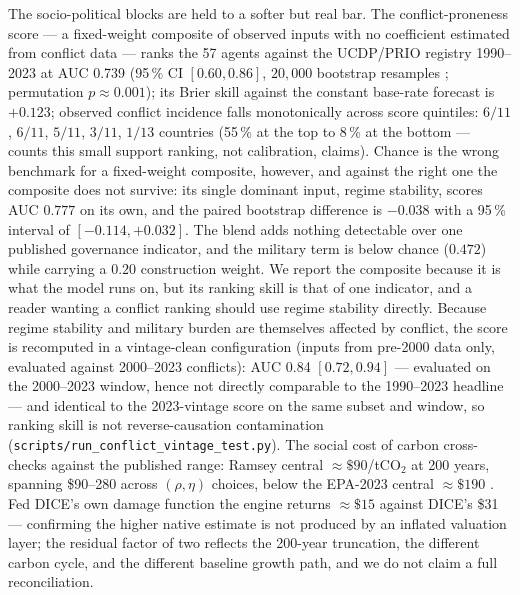 \documentclass[a4paper,fleqn]{cas-sc}
\begin{document}
The socio-political blocks are held to a softer but real bar. The conflict-proneness score ---
a fixed-weight composite of observed inputs with no coefficient estimated from conflict data
--- ranks the 57 agents against the UCDP/PRIO registry 1990--2023 \citep{sundberg2013} at AUC
0.739 (95\,\% CI $[0.60,0.86]$, $20{,}000$ bootstrap resamples \citep{efron1993}; permutation
$p\approx0.001$); its Brier skill against the constant base-rate forecast is $+0.123$; observed
conflict incidence falls monotonically across score quintiles: $6/11$, $6/11$, $5/11$, $3/11$,
$1/13$ countries (55\,\% at the top to 8\,\% at the bottom --- counts this small support
ranking, not calibration, claims). Chance is the wrong benchmark for a fixed-weight composite,
however, and against the right one the composite does not survive: its single dominant input,
regime stability, scores AUC $0.777$ on its own, and the paired bootstrap difference is
$-0.038$ with a 95\,\% interval of $[-0.114,+0.032]$. The blend adds nothing detectable over one
published governance indicator, and the military term is below chance ($0.472$) while carrying a
$0.20$ construction weight. We report the composite because it is what the model runs on, but
its ranking skill is that of one indicator, and a reader wanting a conflict ranking should use
regime stability directly. Because regime
stability and military burden are themselves affected by conflict, the score is recomputed in a
vintage-clean configuration (inputs from pre-2000 data only, evaluated against 2000--2023
conflicts): AUC 0.84 $[0.72,0.94]$ --- evaluated on the 2000--2023 window, hence not directly comparable
to the 1990--2023 headline --- and identical to the 2023-vintage score on the same subset and
window, so ranking skill is not reverse-causation contamination
(\texttt{scripts/run\_conflict\_vintage\_test.py}). The social cost of carbon
cross-checks against the published range: Ramsey central ${\approx}\$90$/tCO$_2$ at 200 years,
spanning \$90--280 across $(\rho,\eta)$ choices, below the EPA-2023 central ${\approx}\$190$
\citep{epa2023,rennert2022}. Fed DICE's own damage function the engine returns ${\approx}\$15$
against DICE's \$31 --- confirming the higher native estimate is not produced by an inflated
valuation layer; the residual factor of two reflects the 200-year truncation, the different
carbon cycle, and the different baseline growth path, and we do not claim a full
reconciliation.
\end{document}
